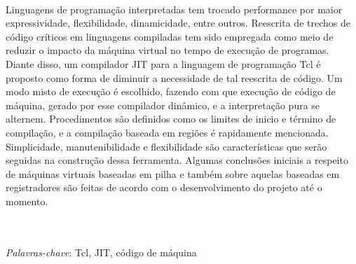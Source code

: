 \\
Linguagens de programação interpretadas tem trocado performance por
maior expressividade, flexibilidade, dinamicidade, entre outros.
Reescrita de trechos de código críticos em linguagens compiladas tem
sido empregada como meio de reduzir o impacto da máquina virtual no
tempo de execução de programas. Diante disso, um compilador JIT para a
linguagem de programação Tcl é proposto como forma de diminuir a
necessidade de tal reescrita de código. Um modo misto de execução é
escolhido, fazendo com que execução de código de máquina, gerado por
esse compilador dinâmico, e a interpretação pura se
alternem. Procedimentos são definidos como os limites de inicio e
término de compilação, e a compilação baseada em regiões é rapidamente
mencionada. Simplicidade, manutenibilidade e flexibilidade são
características que serão seguidas na construção dessa ferramenta.
Algumas conclusões iniciais a respeito de máquinas virtuais baseadas
em pilha e também sobre aquelas baseadas em registradores são feitas
de acordo com o desenvolvimento do projeto até o momento.

\quad\\
\quad\\
\textit{Palavras-chave}: Tcl, JIT, código de máquina
